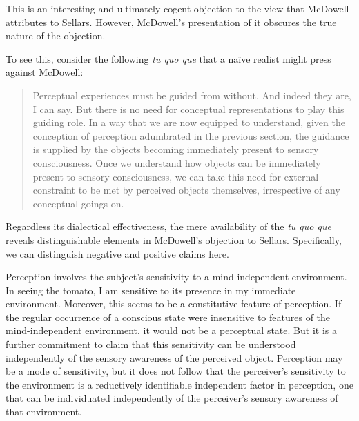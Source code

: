 \documentclass[12pt]{article}
\begin{document}
This is an interesting and ultimately cogent objection to the view that McDowell attributes to Sellars. However, McDowell's presentation of it obscures the true nature of the objection.


To see this, consider the following \emph{tu quo que} that a naïve realist might press against McDowell: 
\begin{quote}
    Perceptual experiences must be guided from without. And indeed they are, I can say. But there is no need for conceptual representations to play this guiding role. In a way that we are now equipped to understand, given the conception of perception adumbrated in the previous section, the guidance is supplied by the objects becoming immediately present to sensory consciousness. Once we understand how objects can be immediately present to sensory consciousness, we can take this need for external constraint to be met by perceived objects themselves, irrespective of any conceptual goings-on.
\end{quote}
Regardless its dialectical effectiveness, the mere availability of the \emph{tu quo que} reveals distinguishable elements in McDowell's objection to Sellars. Specifically, we can distinguish negative and positive claims here.

Perception involves the subject's sensitivity to a mind-independent environment. In seeing the tomato, I am sensitive to its presence in my immediate environment. Moreover, this seems to be a constitutive feature of perception. If the regular occurrence of a conscious state were insensitive to features of the mind-independent environment, it would not be a perceptual state. But it is a further commitment to claim that this sensitivity can be understood independently of the sensory awareness of the perceived object. Perception may be a mode of sensitivity, but it does not follow that the perceiver's sensitivity to the environment is a reductively identifiable independent factor in perception, one that can be individuated independently of the perceiver's sensory awareness of that environment.
\end{document}
